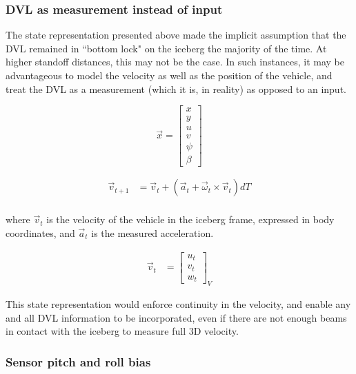 \subsubsection{DVL as measurement instead of input}
\label{sec.VelocityState}

The state representation presented above made the implicit assumption that the DVL remained in ``bottom lock" on the iceberg the majority of the time. At higher standoff distances, this may not be the case. In such instances, it may be advantageous to model the velocity as well as the position of the vehicle, and treat the DVL as a measurement (which it is, in reality) as opposed to an input.

\begin{equation}
\label{eq.altState}
\vec{x}= \left[\begin{array}{c}
                     x \\ y \\ u \\ v \\ \psi \\ \beta 
                     \end{array}\right]
\end{equation}

\begin{align}
\vec{v}_{t+1} &= \vec{v}_t + \left( \vec{a}_t + \vec{\omega}_t \times \vec{v}_t \right)dT\\
\end{align}

where $\vec{v}_t$ is the velocity of the vehicle in the iceberg frame, expressed in body coordinates, and $\vec{a}_t$ is the measured acceleration.
 
\begin{align}
\vec{v}_{t} &=  \left[\begin{array}{c}
                     u_t \\ v_t \\ w_t
                     \end{array}\right]_V
\end{align}

This state representation would enforce continuity in the velocity, and enable any and all DVL information to be incorporated, even if there are not enough beams in contact with the iceberg to measure full 3D velocity.

\subsubsection{Sensor pitch and roll bias}

